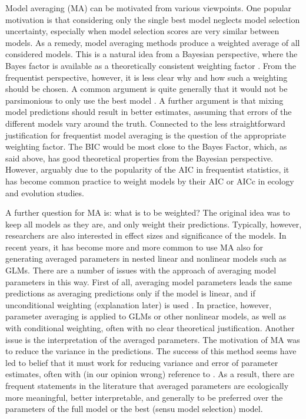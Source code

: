 \documentclass[5p]{elsarticle}
\begin{document}
Model averaging (MA) can be motivated from various viewpoints. One popular motivation is that considering only the single best model neglects model selection uncertainty, especially when model selection scores are very similar between models. As a remedy, model averaging methods produce a weighted average of all considered models. This is a natural idea from a Bayesian perspective, where the Bayes factor is available as a theoretically consistent weighting factor \citep{Kass-BayesFactors-1995}. From the frequentist perspective, however, it is less clear why and how such a weighting should be chosen. A common argument is quite generally that it would not be parsimonious to only use the best model \citep{Burnham-Modelselectionand-2002}. A further argument is that mixing model predictions should result in better estimates, assuming that errors of the different models vary around the truth. Connected to the less straightforward justification for frequentist model averaging is the question of the appropriate weighting factor. The BIC would be most close to the Bayes Factor, which, as said above, has good theoretical properties from the Bayesian perspective. However, arguably due to the popularity of the AIC in frequentist statistics, it has become common practice to weight models by their AIC or AICc in ecology and evolution studies.

A further question for MA is: what is to be weighted? The original idea was to keep all models as they are, and only weight their predictions. Typically, however, researchers are also interested in effect sizes and significance of the models. In recent years, it has become more and more common to use MA also for generating averaged parameters in nested linear and nonlinear models such as GLMs. There are a number of issues with the approach of averaging model parameters in this way. First of all, averaging model parameters leads the same predictions as averaging predictions only if the model is linear, and if unconditional weighting (explanation later) is used \citep{Burnham-Modelselectionand-2002}. In practice, however, parameter averaging is applied to GLMs or other nonlinear models, as well as with conditional weighting, often with no clear theoretical justification. Another issue is the interpretation of the averaged parameters. The motivation of MA was to reduce the variance in the predictions. The success of this method seems have led to belief that it must work for reducing variance and error of parameter estimates, often with (in our opinion wrong) reference to \citet{Burnham-Modelselectionand-2002}. As a result, there are frequent statements in the literature that averaged parameters are ecologically more meaningful, better interpretable, and generally to be preferred over the parameters of the full model or the best (sensu model selection) model.
\end{document}
